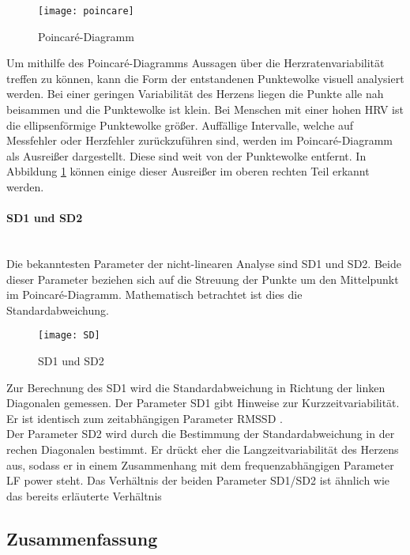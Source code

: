  \begin{figure}[H]
 	\centering
 	\texttt{[image: poincare]}
 	\caption{Poincaré-Diagramm}
 	\label{fig:poincare}
 	\cite{poincare}
 \end{figure}

Um mithilfe des Poincaré-Diagramms Aussagen über die Herzratenvariabilität treffen zu können, kann die Form der entstandenen Punktewolke visuell analysiert werden. Bei einer geringen Variabilität des Herzens liegen die Punkte alle nah beisammen und die Punktewolke ist klein. Bei Menschen mit einer hohen HRV ist die ellipsenförmige Punktewolke größer. Auffällige Intervalle, welche auf Messfehler oder Herzfehler zurückzuführen sind, werden im Poincaré-Diagramm als Ausreißer dargestellt. Diese sind weit von der Punktewolke entfernt. In Abbildung \ref{fig:poincare} können einige dieser Ausreißer im oberen rechten Teil erkannt werden.

 \paragraph{SD1 und SD2}\mbox{} \\
 Die bekanntesten Parameter der nicht-linearen Analyse sind SD1 und SD2. Beide dieser Parameter beziehen sich auf die Streuung der Punkte um den Mittelpunkt im Poincaré-Diagramm. Mathematisch betrachtet ist dies die Standardabweichung.\cite{poincare}
 \begin{figure}[H]
	\centering
	\texttt{[image: SD]}
	\caption{SD1 und SD2}
	\label{fig:SD}
	\cite{poincare}
\end{figure}

Zur Berechnung des SD1 wird die Standardabweichung in Richtung der linken Diagonalen gemessen. Der Parameter SD1 gibt Hinweise zur Kurzzeitvariabilität. Er ist identisch zum zeitabhängigen Parameter RMSSD \cite[S.6]{med}. \\

Der Parameter SD2 wird durch die Bestimmung der Standardabweichung in der rechen Diagonalen bestimmt. Er drückt eher die Langzeitvariabilität des Herzens aus, sodass er in einem Zusammenhang mit dem frequenzabhängigen Parameter LF power steht. Das Verhältnis der beiden Parameter SD1/SD2 ist ähnlich wie das bereits erläuterte Verhältnis \cite[S.7]{med} 

\subsection{Zusammenfassung}

